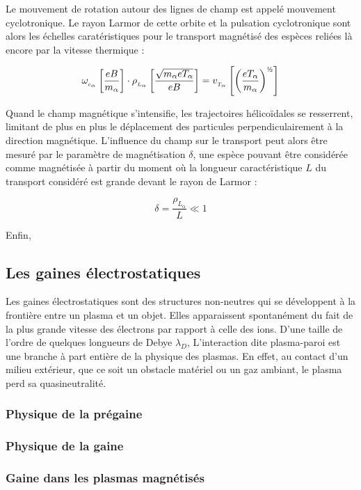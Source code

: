 Le mouvement de rotation autour des lignes de champ est appelé mouvement
cyclotronique. Le rayon Larmor de cette orbite et la pulsation cyclotronique
sont alors les échelles caratéristiques pour le transport magnétisé des espèces
reliées là encore par la vitesse thermique :

\begin{equation}
\omega\indice{c_{\alpha}}\left[\frac{e B}{m_\alpha}\right]
\cdot\rho\indice{L_{\alpha}}\left[\frac{\sqrt{m_\alpha eT_\alpha}}{eB}\right]
=v\indice{T_{\alpha}}\left[\left(\frac{eT_{\alpha}}{m_{\alpha}}\right)^{\text{\textonehalf}}\right]
\end{equation}

Quand le champ magnétique s'intensifie, les trajectoires
hélicoïdales se resserrent, limitant de plus en plus le déplacement des
particules perpendiculairement à la direction magnétique. L'influence du champ
sur le transport peut alors être mesuré par le paramètre de
magnétisation $\delta$, une espèce pouvant être considérée comme magnétisée à
partir du moment où la longueur caractéristique $L$ du transport considéré est
grande devant le rayon de Larmor :

\begin{equation}
\delta=\frac{\rho_{L_{\alpha}}}{L}\ll 1
\end{equation}

Enfin, 

\subsection{Les gaines électrostatiques}
Les gaines électrostatiques sont des structures non-neutres qui se
développent à la frontière entre un plasma et un objet. Elles apparaissent
spontanément du fait de la plus grande vitesse des électrons par rapport à
celle des ions. D'une taille de l'ordre de quelques longueurs de Debye $\lambda_D$,
L'interaction dite plasma-paroi est une branche à part entière de la physique des plasmas.
En effet, au contact d'un milieu extérieur, que ce soit un obstacle matériel
ou un gaz ambiant, le plasma perd sa quasineutralité.
\subsubsection{Physique de la prégaine}
\subsubsection{Physique de la gaine}
\subsubsection{Gaine dans les plasmas magnétisés}
